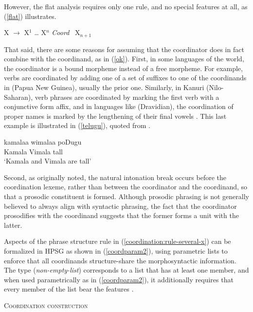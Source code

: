 \noindent
However, the flat analysis requires only one rule, and no
special features at all, as (\ref{flat}) illustrates. 

\ea
\label{flat}
X  $\rightarrow$ X$^1$ \ldots{} X$^n$ \emph{Coord} \, X$_{n+1}$
\z

That said, there are some reasons for assuming that the coordinator does in fact combine with the coordinand, as in (\ref{ok}). First, in some  languages of the world, the coordinator is a bound morpheme instead of a free morpheme. For example,  verbs are coordinated by adding one of a set of suffixes to one of the coordinands in  (Papua New Guinea),  usually the prior one.  Similarly, in Kanuri (Nilo-Saharan), verb phrases are coordinated by marking the first verb with a conjunctive form affix, and
 in languages like  (Dravidian), the coordination of proper names is marked  by the lengthening of their final vowels \citep[]{Drellishak:Bender:05}. This last example is illustrated in (\ref{telugu}), quoted from .

\ea
\label{telugu}
\gll kamalaa wimalaa poDugu \\ 
     Kamala Vimala tall\\
\glt `Kamala and Vimala are tall'
\z



Second, as \citet[165]{ross67} originally noted, the natural intonation break occurs before the coordination lexeme, rather than between the coordinator and the coordinand, so that a  prosodic constituent is formed.
Although prosodic phrasing is not generally believed to always align with syntactic phrasing, the fact that the coordinator prosodifies with the  coordinand suggests that the former forms a unit with the latter.

 Aspects of the phrase structure rule in (\ref{coordination:rule-several-x}) can be formalized in HPSG as
 shown in  (\ref{coordparam2}),  using parametric lists  \citep[, fn.\,2]{pollardsag} to enforce
 that all coordinands structure-share the morphosyntactic information. The type  (\textit{non-empty-list}) corresponds
 to a list that has at least one member, and when used parametrically as in (\ref{coordparam2}), it additionally requires that
 every member of the list bear the features
 .

\ea 
\textsc{Coordination construction}\\
\label{coordparam2}
\z

